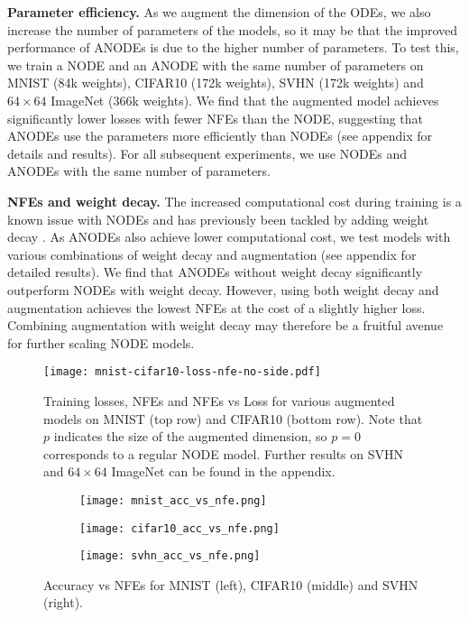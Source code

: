 \documentclass{article}
\begin{document}
\textbf{Parameter efficiency.} As we augment the dimension of the ODEs, we also increase the number of parameters of the models, so it may be that the improved performance of ANODEs is due to the higher number of parameters. To test this, we train a NODE and an ANODE with the same number of parameters on MNIST (84k weights), CIFAR10 (172k weights), SVHN (172k weights) and $64\times64$ ImageNet (366k weights). We find that the augmented model achieves significantly lower losses with fewer NFEs than the NODE, suggesting that ANODEs use the parameters more efficiently than NODEs (see appendix for details and results). For all subsequent experiments, we use NODEs and ANODEs with the same number of parameters.

\textbf{NFEs and weight decay.} The increased computational cost during training is a known issue with NODEs and has previously been tackled by adding weight decay \citep{grathwohl2018ffjord}. As ANODEs also achieve lower computational cost, we test models with various combinations of weight decay and augmentation (see appendix for detailed results). We find that ANODEs without weight decay significantly outperform NODEs with weight decay. However, using both weight decay and augmentation achieves the lowest NFEs at the cost of a slightly higher loss. Combining augmentation with weight decay may therefore be a fruitful avenue for further scaling NODE models.

\begin{figure}[t]
\begin{center}
\texttt{[image: mnist-cifar10-loss-nfe-no-side.pdf]}
\end{center}
\setlength{\abovecaptionskip}{-5pt}
\setlength{\belowcaptionskip}{-10pt}
\caption{Training losses, NFEs and NFEs vs Loss for various augmented models on MNIST (top row) and CIFAR10 (bottom row). Note that $p$ indicates the size of the augmented dimension, so $p=0$ corresponds to a regular NODE model. Further results on SVHN and $64\times64$ ImageNet can be found in the appendix.}
\label{img-losses-nfes}
\end{figure}

\begin{figure}[b]
\centering
\begin{subfigure}[t]{0.32\linewidth}
\centering
\texttt{[image: mnist\_acc\_vs\_nfe.png]}
\end{subfigure}
\begin{subfigure}[t]{0.32\linewidth}
\centering
\texttt{[image: cifar10\_acc\_vs\_nfe.png]}
\end{subfigure}
\begin{subfigure}[t]{0.32\linewidth}
\centering
\texttt{[image: svhn\_acc\_vs\_nfe.png]}
\end{subfigure}
\caption{Accuracy vs NFEs for MNIST (left), CIFAR10 (middle) and SVHN (right).}
\label{acc-vs-nfe}
\end{figure}
\end{document}
